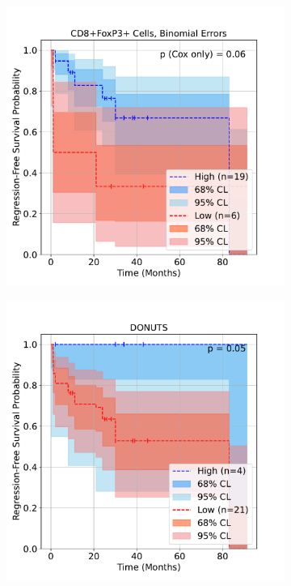 \documentclass[article]{jss}
\begin{document}
\begin{figure}[ht]
\begin{subfigure}[t]{\figwidth}
    \caption{\label{fig:lung-dataset-cells-patient-wise}}
  \end{subfigure}
  \begin{subfigure}[t]{\figwidth}
    \centering
    \includegraphics[width=\linewidth]{lung_cells_km_RFS_binomial.pdf}
    \caption{\label{fig:lung-dataset-cells-binomial}}
  \end{subfigure}
  \begin{subfigure}[t]{\figwidth}
    \centering
    \includegraphics[width=\linewidth]{lung_donuts_km_RFS.pdf}

\end{subfigure}
\end{figure}
\end{document}
